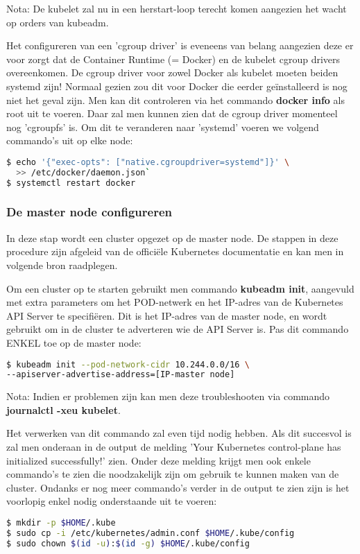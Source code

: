 Nota: De kubelet zal nu in een herstart-loop terecht komen aangezien het wacht op orders van kubeadm.

Het configureren van een 'cgroup driver' is eveneens van belang aangezien deze er voor zorgt dat de Container Runtime (= Docker) en de kubelet cgroup drivers overeenkomen. De cgroup driver voor zowel Docker als kubelet moeten beiden systemd zijn! 
Normaal gezien zou dit voor Docker die eerder geïnstalleerd is nog niet het geval zijn. Men kan dit controleren via het commando {\bf docker info} als root uit te voeren. Daar zal men kunnen zien dat de cgroup driver momenteel nog 'cgroupfs' is. Om dit te veranderen naar 'systemd' voeren we volgend commando's uit op elke node: 
\begin{lstlisting}[language=bash]
$ echo '{"exec-opts": ["native.cgroupdriver=systemd"]}' \ 
  >> /etc/docker/daemon.json`
$ systemctl restart docker
\end{lstlisting}

\subsubsection{De master node configureren}
\label{subsubsec:masternodeconfig}

In deze stap wordt een cluster opgezet op de master node. De stappen in deze procedure zijn afgeleid van de officiële Kubernetes documentatie en kan men in volgende bron raadplegen. \autocite{Kubernetes2022b}

Om een cluster op te starten gebruikt men commando {\bf kubeadm init}, aangevuld met extra parameters om het POD-netwerk en het IP-adres van de Kubernetes API Server te specifiëren. Dit is het IP-adres van de master node, en wordt gebruikt om in de cluster te adverteren wie de API Server is. Pas dit commando ENKEL toe op de master node: 
\begin{lstlisting}[language=bash]
$ kubeadm init --pod-network-cidr 10.244.0.0/16 \
--apiserver-advertise-address=[IP-master node]

\end{lstlisting}

Nota: Indien er problemen zijn kan men deze troubleshooten via commando {\bf journalctl -xeu kubelet}. 

Het verwerken van dit commando zal even tijd nodig hebben. Als dit succesvol is zal men onderaan in de output de melding 'Your Kubernetes control-plane has initialized successfully!' zien. Onder deze melding krijgt men ook enkele commando's te zien die noodzakelijk zijn om gebruik te kunnen maken van de cluster. Ondanks er nog meer commando's verder in de output te zien zijn is het voorlopig enkel nodig onderstaande uit te voeren:
\begin{lstlisting}[language=bash]
$ mkdir -p $HOME/.kube
$ sudo cp -i /etc/kubernetes/admin.conf $HOME/.kube/config
$ sudo chown $(id -u):$(id -g) $HOME/.kube/config

\end{lstlisting}

